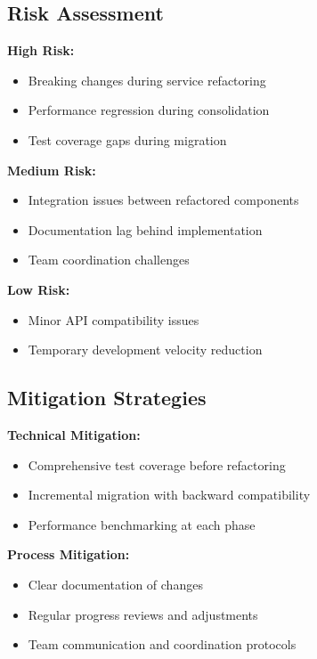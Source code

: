 \documentclass[10pt]{article}
\begin{document}
\subsection{Risk Assessment}

\textbf{High Risk:}
\begin{itemize}
    \item Breaking changes during service refactoring
    \item Performance regression during consolidation
    \item Test coverage gaps during migration
\end{itemize}

\textbf{Medium Risk:}
\begin{itemize}
    \item Integration issues between refactored components
    \item Documentation lag behind implementation
    \item Team coordination challenges
\end{itemize}

\textbf{Low Risk:}
\begin{itemize}
    \item Minor API compatibility issues
    \item Temporary development velocity reduction
\end{itemize}

\subsection{Mitigation Strategies}

\textbf{Technical Mitigation:}
\begin{itemize}
    \item Comprehensive test coverage before refactoring
    \item Incremental migration with backward compatibility
    \item Performance benchmarking at each phase
\end{itemize}

\textbf{Process Mitigation:}
\begin{itemize}
    \item Clear documentation of changes
    \item Regular progress reviews and adjustments
    \item Team communication and coordination protocols
\end{itemize}
\end{document}
